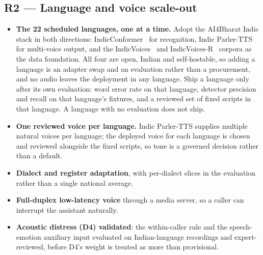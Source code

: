 \documentclass[11pt,a4paper]{article}
\begin{document}
\subsection{R2 --- Language and voice scale-out}
\begin{itemize}
  \item \textbf{The 22 scheduled languages, one at a time.} Adopt the AI4Bharat Indic stack in both
        directions: IndicConformer~\cite{indicconformer} for recognition, Indic
        Parler-TTS~\cite{parlertts} for multi-voice output, and the IndicVoices~\cite{indicvoices} and
        IndicVoices-R~\cite{indicvoicesr} corpora as the data foundation. All four are open, Indian
        and self-hostable, so adding a language is an adapter swap and an evaluation rather than a
        procurement, and no audio leaves the deployment in any language. Ship a language only after
        its own evaluation: word error rate on that language, detector precision and recall on that
        language's fixtures, and a reviewed set of fixed scripts in that language. A language with no
        evaluation does not ship.
  \item \textbf{One reviewed voice per language.} Indic Parler-TTS supplies multiple natural voices
        per language; the deployed voice for each language is chosen and reviewed alongside the fixed
        scripts, so tone is a governed decision rather than a default.
  \item \textbf{Dialect and register adaptation}, with per-dialect slices in the evaluation rather
        than a single national average.
  \item \textbf{Full-duplex low-latency voice} through a media server, so a caller can interrupt the
        assistant naturally.
  \item \textbf{Acoustic distress (D4) validated}: the within-caller rule and the speech-emotion
        auxiliary input evaluated on Indian-language recordings and expert-reviewed, before D4's
        weight is treated as more than provisional.
\end{itemize}
\end{document}
